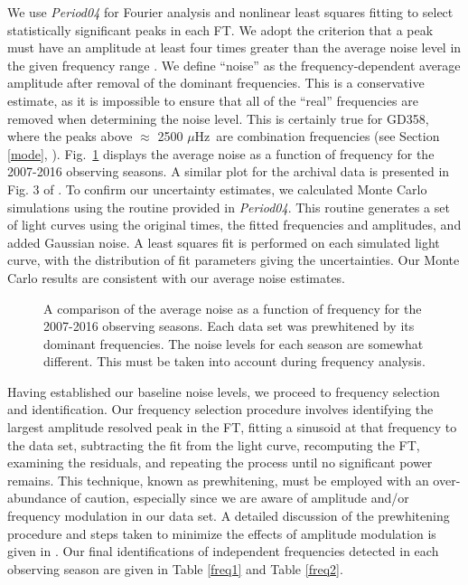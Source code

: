 \documentclass[12pt,preprint]{aastex}
\begin{document}
We use {\sl Period04} \citep{Lenz05} for Fourier analysis and nonlinear least squares fitting to 
select statistically significant peaks in each FT. We adopt the criterion that a peak must have 
an amplitude at least four times greater than the average noise level in the given frequency range 
\citep{Provencal12}. We define ``noise'' as the frequency-dependent 
average amplitude after removal of the dominant frequencies. This is a conservative estimate, 
as it is impossible to ensure that all of the ``real'' frequencies are removed when determining
the noise level. This is certainly true for GD358, where the peaks above $\approx$ 2500 $\mu$Hz\ 
are combination frequencies (see Section \ref{mode}, \citet{Provencal09}).  Fig.~\ref{noise} displays the average noise 
as a function of frequency for the 2007-2016 observing seasons. A similar plot for the 
archival data is presented in Fig. 3 of \citet{Provencal09}. To confirm our uncertainty 
estimates, we calculated Monte Carlo simulations using the routine provided in {\sl Period04}.  
This routine generates a set of light curves using the original times, the fitted frequencies and 
amplitudes, and added Gaussian noise. A least squares fit is performed on each simulated light 
curve, with the distribution of fit parameters giving the uncertainties. Our Monte Carlo results 
are consistent with our average noise estimates.

\begin{figure}
\caption{A comparison of the average noise as a function of frequency for the 2007-2016 observing 
seasons.  Each data set was prewhitened by its dominant frequencies.  The noise levels for each 
season are somewhat different.  This must be taken into account during frequency analysis.  
\label{noise}
}
\end{figure}

Having established our baseline noise levels, we proceed to frequency selection and identification.
Our frequency selection procedure involves identifying the largest amplitude resolved peak in the FT,
fitting a sinusoid at that frequency to the data set, subtracting the fit from the light curve, 
recomputing the FT, examining the residuals, and repeating the process until no significant power 
remains. This technique, known as prewhitening, must be employed with an over-abundance of caution, 
especially since we are aware of amplitude and/or frequency modulation in our data set. A detailed
discussion of the prewhitening procedure and steps taken to minimize the effects of amplitude 
modulation is given in \citet{Provencal09}. Our final identifications of independent frequencies
detected in each observing season are given in Table \ref{freq1} and Table \ref{freq2}.
\end{document}
